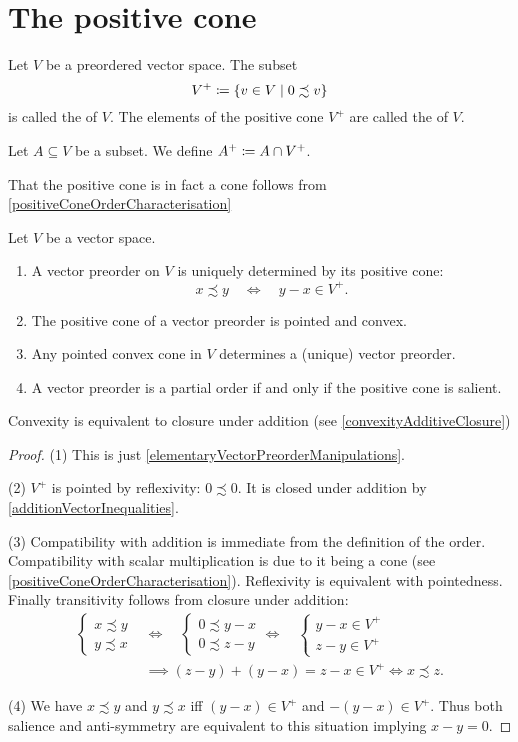 \section{The positive cone}
\begin{definition}
Let $V$ be a preordered vector space. The subset
\[ V^+ \defeq \setbuilder{v\in V}{0 \precsim v} \]
is called the  of $V$. The elements of the positive cone $V^+$ are called the  of $V$.

Let $A\subseteq V$ be a subset. We define $A^+ \coloneqq A\cap V^+$.
\end{definition}
That the positive cone is in fact a cone follows from \ref{positiveConeOrderCharacterisation}
\begin{proposition} \label{positiveCone}
Let $V$ be a vector space.
\begin{enumerate}
\item A vector preorder on $V$ is uniquely determined by its positive cone:
\[ x \precsim y \quad\iff\quad y-x \in V^+. \]
\item The positive cone of a vector preorder is pointed and convex.
\item Any pointed convex cone in $V$ determines a (unique) vector preorder.
\item A vector preorder is a partial order \textup{if and only if} the positive cone is salient.
\end{enumerate}
\end{proposition}
Convexity is equivalent to closure under addition (see \ref{convexityAdditiveClosure})
\begin{proof}
(1) This is just \ref{elementaryVectorPreorderManipulations}.

(2) $V^+$  is pointed by reflexivity: $0\precsim 0$. It is closed under addition by \ref{additionVectorInequalities}.

(3) Compatibility with addition is immediate from the definition of the order. Compatibility with scalar multiplication is due to it being a cone (see \ref{positiveConeOrderCharacterisation}). Reflexivity is equivalent with pointedness. Finally transitivity follows from closure under addition:
\begin{align*}
 \begin{cases}
x\precsim y \\ y\precsim x
\end{cases} &\iff \quad \begin{cases}
0 \precsim y -x \\ 0 \precsim z-y
\end{cases} \iff\quad \begin{cases}
y-x \in V^+ \\ z-y \in V^+
\end{cases} \\
&\implies (z-y)+(y-x) = z-x \in V^+ \iff x \precsim z. 
\end{align*}

(4) We have $x\precsim y$ and $y\precsim x$ iff $(y-x) \in V^+$ and $-(y-x) \in V^+$. Thus both salience and anti-symmetry are equivalent to this situation implying $x-y = 0$.
\end{proof}


